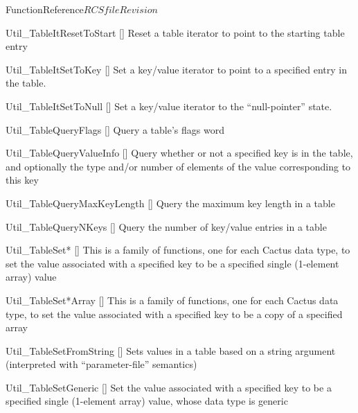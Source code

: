 \begin{cactuspart}{FunctionReference}{$RCSfile$}{$Revision$}
\begin{Lentry}
\item[Util\_TableItResetToStart]
     [\pageref{Util-TableItResetToStart}]
Reset a table iterator to point to the starting table entry

\item[Util\_TableItSetToKey]
     [\pageref{Util-TableItSetToKey}]
Set a key/value iterator to point to a specified entry in the table.

\item[Util\_TableItSetToNull]
     [\pageref{Util-TableItSetToNull}]
Set a key/value iterator to the ``null-pointer'' state.

\item[Util\_TableQueryFlags]
     [\pageref{Util-TableQueryFlags}]
Query a table's flags word

\item[Util\_TableQueryValueInfo]
     [\pageref{Util-TableQueryValueInfo}]
Query whether or not a specified key is in the table, and optionally
the type and/or number of elements of the value corresponding to this key

\item[Util\_TableQueryMaxKeyLength]
     [\pageref{Util-TableQueryMaxKeyLength}]
Query the maximum key length in a table

\item[Util\_TableQueryNKeys]
     [\pageref{Util-TableQueryNKeys}]
Query the number of key/value entries in a table

\item[Util\_TableSet*]
     [\pageref{Util-TableSet*}]
This is a family of functions, one for each Cactus data type,
to set the value associated with a specified key to be a specified
single (1-element array) value

\item[Util\_TableSet*Array]
     [\pageref{Util-TableSet*Array}]
This is a family of functions, one for each Cactus data type,
to set the value associated with a specified key to be a copy
of a specified array

\item[Util\_TableSetFromString]
     [\pageref{Util-TableSetFromString}]
Sets values in a table based on a string argument (interpreted with
``parameter-file'' semantics)

\item[Util\_TableSetGeneric]
     [\pageref{Util-TableSetGeneric}]
Set the value associated with a specified key to be a specified
single (1-element array) value, whose data type is generic


\end{Lentry}
\end{cactuspart}
